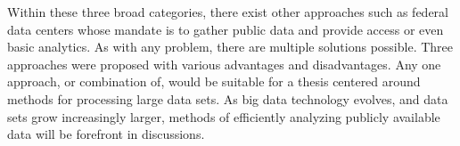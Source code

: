 Within these three broad categories, there exist other approaches such as federal data centers whose mandate is to gather public data and provide access or even basic analytics. As with any problem, there are multiple solutions possible.  Three approaches were proposed with various advantages and disadvantages. Any one approach, or combination of, would be suitable for a thesis centered around methods for processing large data sets. As big data technology evolves, and data sets grow increasingly larger, methods of efficiently analyzing publicly available data will be forefront in discussions.